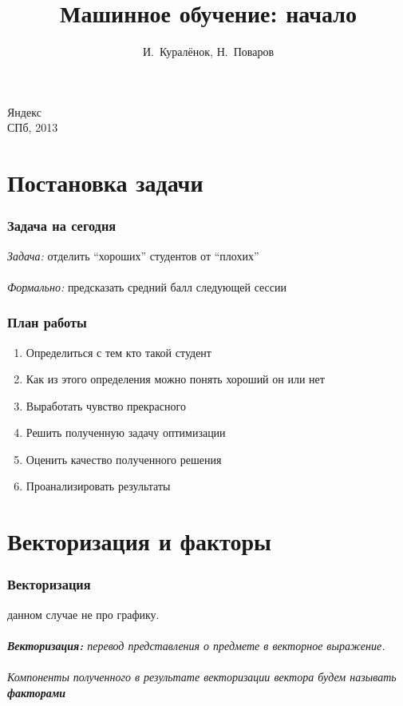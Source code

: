 \documentclass[14pt, fleqn, xcolor={dvipsnames, table}]{beamer}
\title{Машинное обучение: начало\\\small{}}
\author[]{\small{%
И.~Куралёнок,
Н.~Поваров}}
\date{}
\begin{document}
\begin{frame}
\maketitle
\small
\begin{center}
\vspace{-60pt}
\normalsize {\color{red}Я}ндекс \\
\vspace{80pt}
\footnotesize СПб, 2013
\end{center}
\end{frame}

\section{Постановка задачи}
\begin{frame}
\frametitle{Задача на сегодня}
\emph{Задача:} отделить ``хороших'' студентов от ``плохих'' \\
\\
\emph{Формально:} предсказать средний балл следующей сессии
\end{frame}

\begin{frame}
\frametitle{План работы}
\begin{enumerate}
\item Определиться с тем кто такой студент
\item Как из этого определения можно понять хороший он или нет
\item Выработать чувство прекрасного
\item Решить полученную задачу оптимизации
\item Оценить качество полученного решения
\item Проанализировать результаты
\end{enumerate}
\end{frame}

\section{Векторизация и факторы}
\begin{frame}
\frametitle{Векторизация}
{ данном случае не про графику.} \\
\\
\emph{\textbf{Векторизация:} перевод представления о предмете в векторное выражение.}\\
\\
\emph{Компоненты полученного в результате векторизации вектора будем называть \textbf{факторами}}
\end{frame}
\end{document}
